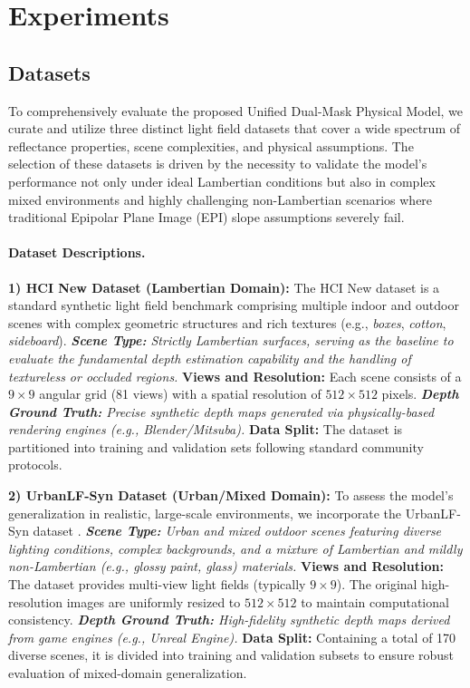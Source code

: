 \section{Experiments}

\subsection{Datasets}

To comprehensively evaluate the proposed Unified Dual-Mask Physical Model, we curate and utilize three distinct light field datasets that cover a wide spectrum of reflectance properties, scene complexities, and physical assumptions. The selection of these datasets is driven by the necessity to validate the model's performance not only under ideal Lambertian conditions but also in complex mixed environments and highly challenging non-Lambertian scenarios where traditional Epipolar Plane Image (EPI) slope assumptions severely fail. 

\paragraph{Dataset Descriptions.}

\textbf{1) HCI New Dataset (Lambertian Domain):} 
The HCI New dataset is a standard synthetic light field benchmark comprising multiple indoor and outdoor scenes with complex geometric structures and rich textures (e.g., \textit{boxes}, \textit{cotton}, \textit{sideboard}). 
\textit{ \textbf{Scene Type:} Strictly Lambertian surfaces, serving as the baseline to evaluate the fundamental depth estimation capability and the handling of textureless or occluded regions.
} \textbf{Views and Resolution:} Each scene consists of a $9 \times 9$ angular grid (81 views) with a spatial resolution of $512 \times 512$ pixels.
\textit{ \textbf{Depth Ground Truth:} Precise synthetic depth maps generated via physically-based rendering engines (e.g., Blender/Mitsuba).
} \textbf{Data Split:} The dataset is partitioned into training and validation sets following standard community protocols.

\textbf{2) UrbanLF-Syn Dataset (Urban/Mixed Domain):} 
To assess the model's generalization in realistic, large-scale environments, we incorporate the UrbanLF-Syn dataset . 
\textit{ \textbf{Scene Type:} Urban and mixed outdoor scenes featuring diverse lighting conditions, complex backgrounds, and a mixture of Lambertian and mildly non-Lambertian (e.g., glossy paint, glass) materials.
} \textbf{Views and Resolution:} The dataset provides multi-view light fields (typically $9 \times 9$). The original high-resolution images are uniformly resized to $512 \times 512$ to maintain computational consistency.
\textit{ \textbf{Depth Ground Truth:} High-fidelity synthetic depth maps derived from game engines (e.g., Unreal Engine).
} \textbf{Data Split:} Containing a total of 170 diverse scenes, it is divided into training and validation subsets to ensure robust evaluation of mixed-domain generalization.

